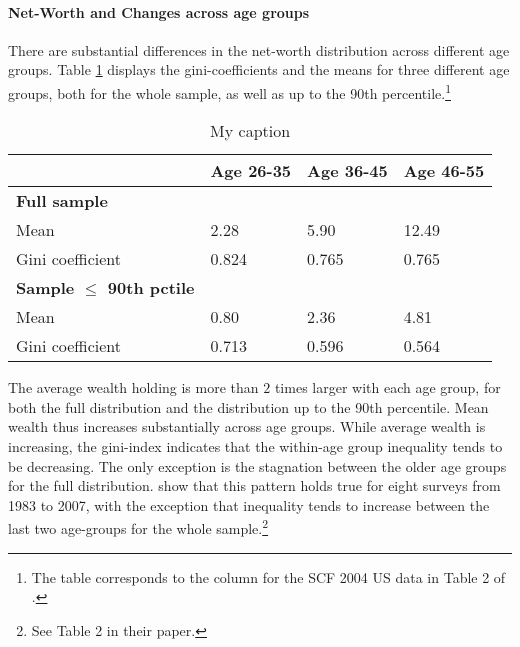 \documentclass[a4paper,12pt,legno]{article}
\begin{document}
\paragraph{Net-Worth and Changes across age groups}
There are substantial differences in the net-worth distribution across different age groups. Table \ref{facts_changes} displays the gini-coefficients and the means for three different age groups, both for the whole sample, as well as up to the 90th percentile.\footnote{The table corresponds to the column for the SCF 2004 US data in Table 2 of \cite{hintermaier2011}. } \\

\begin{table}[!htbp]
\centering
\caption{My caption}
\label{facts_changes}
\begin{tabular}{@{}llll@{}}
\toprule
                     & Age 26-35 & Age 36-45 & Age 46-55 \\ \midrule
\textbf{Full sample}          &           &           &           \\
Mean                 & 2.28      & 5.90      & 12.49     \\
Gini coefficient     & 0.824     & 0.765     & 0.765     \\
\textbf{Sample $\leq$ 90th pctile} &           &           &           \\
Mean                 & 0.80      & 2.36      & 4.81      \\
Gini coefficient     & 0.713     & 0.596     & 0.564     \\ \bottomrule
\end{tabular}
\end{table}

The average wealth holding is more than $2$ times larger with each age group, for both the full distribution and the distribution up to the 90th percentile. Mean wealth thus increases substantially across age groups. While average wealth is increasing, the gini-index indicates that the within-age group inequality tends to be decreasing. The only exception is the stagnation between the older age groups for the full distribution. \cite{hintermaier2011} show that this pattern holds true for eight surveys from 1983 to 2007, with the exception that inequality tends to  increase between the last two age-groups for the whole sample.\footnote{See Table 2 in their paper.} \\
\end{document}
